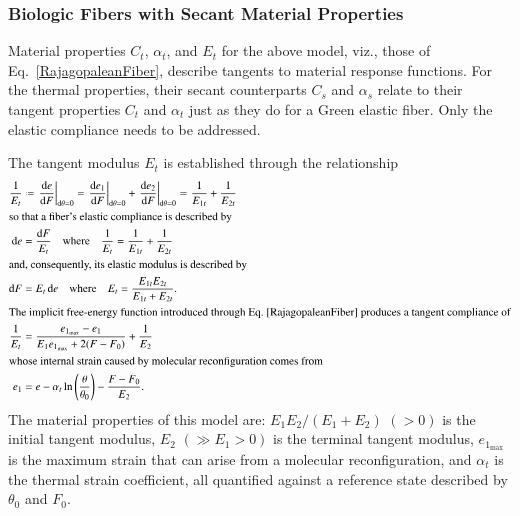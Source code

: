\subsubsection{Biologic Fibers with Secant Material Properties}

Material properties $C_t$, $\alpha_t$, and $E_t$ for the above model, viz., those of Eq.~\ref{RajagopaleanFiber}, describe tangents to material response functions.  For the thermal properties, their secant counterparts $C_s$ and $\alpha_s$ relate to their tangent properties $C_t$ and $\alpha_t$ just as they do for a Green elastic fiber.  Only the elastic compliance needs to be addressed.

The tangent modulus $E_t$ is established through the relationship
\begin{subequations}
    \label{tangentModuliFiber}
    \begin{align}
    \frac{1}{E_t} & \defeq 
    \left. \frac{\mathrm{d}e}{\mathrm{d}F}
    \right|_{\mathrm{d}\theta = 0} = 
    \left. \frac{\mathrm{d}e_1}{\mathrm{d}F}
    \right|_{\mathrm{d}\theta = 0} + 
    \left. \frac{\mathrm{d}e_2}{\mathrm{d}F}
    \right|_{\mathrm{d}\theta = 0} \eqdef
    \frac{1}{E_{1t}} + \frac{1}{E_{2t}}
    \label{defineTangentModuliFiber} \\
    \intertext{so that a fiber's elastic compliance is described by}
    \mathrm{d}e & = \frac{\mathrm{d}F}{E_t} 
    \quad \text{where} \quad
    \frac{1}{E_t} = \frac{1}{E_{1t}} + \frac{1}{E_{2t}} \\
    \intertext{and, consequently, its elastic modulus is described by}
    \mathrm{d}F & = E_t \, \mathrm{d}e
    \quad \text{where} \quad
    E_t = \frac{E_{1t} E_{2t}}{E_{1t} + E_{2t}} . \\
    \intertext{The implicit free-energy function introduced through Eq.~\ref{RajagopaleanFiber} produces a tangent compliance of}
    \frac{1}{E_t} & =
    \frac{e_{1_{\max}} - e_1}{E_1 e_{1_{\max}} + 2(F - F_0)} + \frac{1}{E_2} 
    \label{tangentModuliBioFiber} \\
    \intertext{whose internal strain caused by molecular reconfiguration comes from}
    e_1 & = e - \alpha_t \ln \left( \frac{\theta}{\theta_0} \right) -
    \frac{F-F_0}{E_2} .
    \label{reconfigurationStrainFiber}
    \end{align}
\end{subequations}
The material properties of this model are: $E_1 E_2 / (E_1 + E_2)$ $(>0)$ is the initial tangent modulus, $E_2$ $(\gg E_1 > 0)$ is the terminal tangent modulus, $e_{1_{\max}}$ is the maximum strain that can arise from a molecular reconfiguration, and $\alpha_t$ is the thermal strain coefficient, all quantified against a reference state described by $\theta_0$ and $F_0$. 
 

